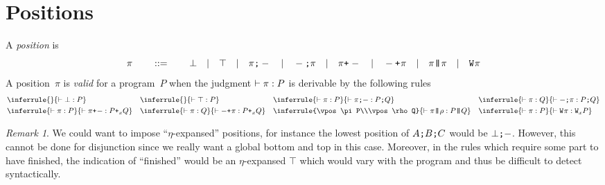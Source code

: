 \documentclass[a4paper]{article}
\theoremstyle{theorem}
\newtheorem{lemma}[theorem]{Lemma}
\theoremstyle{example}
\theoremstyle{remark}
\newtheorem{remark}[theorem]{Remark}
\begin{document}
\section{Positions}
A \emph{position} is
\[
  \pi
  \qquad::=\qquad
  \bot
  \quad|\quad
  \top
  \quad|\quad
  \pi\texttt{;}-
  \quad|\quad
  -\texttt{;}\pi
  \quad|\quad
  \pi\texttt{+}_{}-
  \quad|\quad
  -\texttt{+}_{}\pi
  \quad|\quad
  \pi\texttt{|\!\!|}\pi
  \quad|\quad
  \texttt{W}_{}\pi
\]
A position~$\pi$ is \emph{valid} for a program~$P$ when the judgment
$\vdash \pi:P$ is derivable by the following rules
\begin{align*}
  &
  \inferrule{\null}{\vpos\pbot P}
  &&
  \inferrule{\null}{\vpos\ptop P}
  &&
  \inferrule{\vpos\pi P}{\vpos{\pseql\pi}{\pseq PQ}}
  &&
  \inferrule{\vpos\pi Q}{\vpos{\pseqr\pi}{\pseq PQ}}
  \\
  &
  \inferrule{\vpos\pi P}{\vpos{\porl\pi}{\por xPQ}}
  &&
  \inferrule{\vpos\pi Q}{\vpos{\porr\pi}{\por xPQ}}
  &&
  \inferrule{\vpos\pi P\\\vpos\rho Q}{\vpos{\ppar\pi\rho}{\ppar PQ}}
  &&
  \inferrule{\vpos\pi P}{\vpos{\ploopl\pi}{\ploop xP}}
\end{align*}





\begin{remark}
  We could want to impose ``$\eta$-expansed'' positions, for instance the lowest
  position of $A\texttt{;}B\texttt{;}C$ would be $\bot\texttt{;}-$. However, this cannot be
  done for disjunction since we really want a global bottom and top in this
  case. Moreover, in the rules which require some part to have finished, the
  indication of ``finished'' would be an $\eta$-expansed $\top$ which would vary
  with the program and thus be difficult to detect syntactically.
\end{remark}
\end{document}
